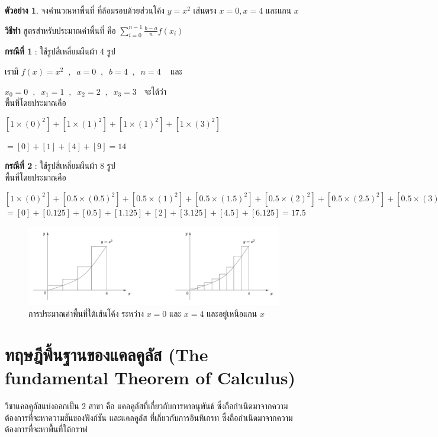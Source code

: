 \documentclass[
]{book}
\theoremstyle{definition}
\theoremstyle{definition}
\newtheorem{example}{ตัวอย่าง}[chapter]
\theoremstyle{definition}
\theoremstyle{definition}
\theoremstyle{remark}
\begin{document}
\begin{example}
จงคำนวณหาพื้นที่ ที่ล้อมรอบด้วยส่วนโค้ง \(y=x^2\) เส้นตรง \(x=0,x=4\) และแกน \(x\)
\end{example}

\textbf{วิธีทำ} สูตรสำหรับประมาณค่าพื้นที่ คือ \(\sum_{i=0}^{n-1}\frac{b-a}{n}f(x_i)\)

\textbf{กรณีที่ 1} : ใช้รูปสี่เหลี่ยมผืนผ้า 4 รูป

เรามี \(f(x)=x^2\;\;,\;\;a=0\;\;,\;\;b=4\;\;,\;\;n=4\;\;\;\) และ

\(x_0=0\;\;,\;\;x_1=1\;\;,\;\;x_2=2\;\;,\;\;x_3=3\;\;\) จะได้ว่า\\
พื้นที่โดยประมาณคือ

\([1\times (0)^2]+[1\times (1)^2]+[1\times (1)^2]+ [1\times (3)^2]\)

\(=[0]+[1]+[4]+[9]=14\)

\textbf{กรณีที่ 2} : ใช้รูปสี่เหลี่ยมผืนผ้า 8 รูป\\
พื้นที่โดยประมาณคือ

\([1\times (0)^2]+[0.5\times (0.5)^2]+[0.5\times (1)^2]+ [0.5\times (1.5)^2]+ [0.5\times (2)^2]+ [0.5\times (2.5)^2]+ [0.5\times (3)^2]= [0.5\times (3.5)^2]\)\\
\(=[0]+[0.125]+[0.5]+[1.125]+[2]+[3.125]+[4.5]+[6.125]=17.5\)

\begin{figure}
\includegraphics[width=1\linewidth]{images/fig-area-3} \caption{การประมาณค่าพื้นที่ใต้เส้นโค้ง ระหว่าง $x=0$ และ $x=4$ และอยู่เหนือแกน $x$}\label{fig:fig-area-3}
\end{figure}

\section{ทฤษฎีพื้นฐานของแคลคูลัส (The fundamental Theorem of Calculus)}\label{uxe17uxe24uxe29uxe0euxe1euxe19uxe10uxe32uxe19uxe02uxe2duxe07uxe41uxe04uxe25uxe04uxe25uxe2a-the-fundamental-theorem-of-calculus}

วิชาแคลคูลัสแบ่งออกเป็น 2 สาขา คือ แคลคูลัสที่เกี่ยวกับการหาอนุพันธ์
ซึ่งถือกำเนิดมาจากความต้องการที่จะหาความชันของฟังก์ชัน และแคลคูลัส ที่เกี่ยวกับการอินทิเกรท
ซึ่งถือกำเนิดมาจากความต้องการที่จะหาพื้นที่ใต้กราฟ
\end{document}
